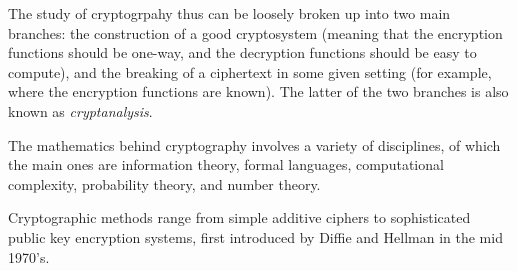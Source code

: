 \documentclass[12pt]{article}
\begin{document}
The study of cryptogrpahy thus can be loosely broken up into two main branches: the construction of a good cryptosystem (meaning that the encryption functions should be one-way, and the decryption functions should be easy to compute), and the breaking of a ciphertext in some given setting (for example, where the encryption functions are known).  The latter of the two branches is also known as \emph{cryptanalysis}.

The mathematics behind cryptography involves a variety of disciplines, of which the main ones are information theory, formal languages, computational complexity, probability theory, and number theory.

Cryptographic methods range from simple additive ciphers to sophisticated public key encryption systems, first introduced by Diffie and Hellman in the mid 1970's.
\end{document}
